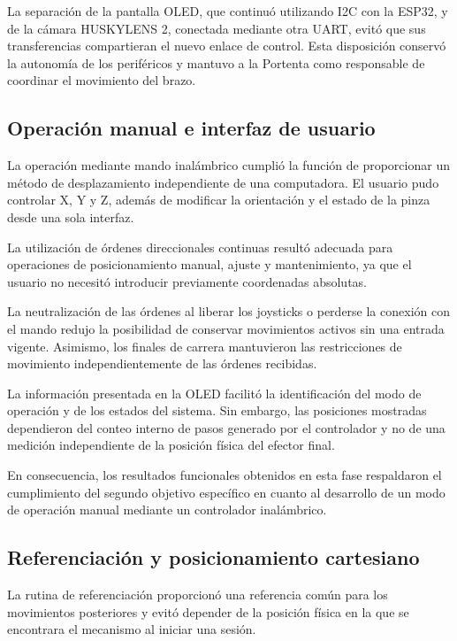 La separación de la pantalla OLED, que continuó utilizando I2C con la ESP32, y de la cámara HUSKYLENS 2, conectada mediante otra UART, evitó que sus transferencias compartieran el nuevo enlace de control. Esta disposición conservó la autonomía de los periféricos y mantuvo a la Portenta como responsable de coordinar el movimiento del brazo.


\subsection{Operación manual e interfaz de usuario}

La operación mediante mando inalámbrico cumplió la función de proporcionar un método de desplazamiento independiente de una computadora. El usuario pudo controlar X, Y y Z, además de modificar la orientación y el estado de la pinza desde una sola interfaz.

La utilización de órdenes direccionales continuas resultó adecuada para operaciones de posicionamiento manual, ajuste y mantenimiento, ya que el usuario no necesitó introducir previamente coordenadas absolutas.

La neutralización de las órdenes al liberar los joysticks o perderse la conexión con el mando redujo la posibilidad de conservar movimientos activos sin una entrada vigente. Asimismo, los finales de carrera mantuvieron las restricciones de movimiento independientemente de las órdenes recibidas.

La información presentada en la OLED facilitó la identificación del modo de operación y de los estados del sistema. Sin embargo, las posiciones mostradas dependieron del conteo interno de pasos generado por el controlador y no de una medición independiente de la posición física del efector final.

En consecuencia, los resultados funcionales obtenidos en esta fase respaldaron el cumplimiento del segundo objetivo específico en cuanto al desarrollo de un modo de operación manual mediante un controlador inalámbrico.


\subsection{Referenciación y posicionamiento cartesiano}

La rutina de referenciación proporcionó una referencia común para los movimientos posteriores y evitó depender de la posición física en la que se encontrara el mecanismo al iniciar una sesión.

